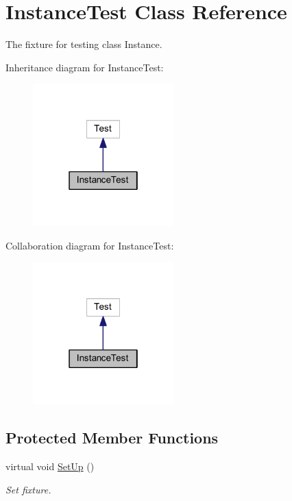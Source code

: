 \hypertarget{class_instance_test}{}\section{Instance\+Test Class Reference}
\label{class_instance_test}


The fixture for testing class Instance.  




Inheritance diagram for Instance\+Test\+:
\nopagebreak
\begin{figure}[H]
\begin{center}
\leavevmode
\includegraphics[width=154pt]{class_instance_test__inherit__graph}
\end{center}
\end{figure}


Collaboration diagram for Instance\+Test\+:
\nopagebreak
\begin{figure}[H]
\begin{center}
\leavevmode
\includegraphics[width=154pt]{class_instance_test__coll__graph}
\end{center}
\end{figure}
\subsection*{Protected Member Functions}
\begin{DoxyCompactItemize}
\item 
\hypertarget{class_instance_test_aada9591781662307abc3e7511d14187c}{}\label{class_instance_test_aada9591781662307abc3e7511d14187c} 
virtual void \hyperlink{class_instance_test_aada9591781662307abc3e7511d14187c}{Set\+Up} ()
\begin{DoxyCompactList}\small\item\em Set fixture. \end{DoxyCompactList}\end{DoxyCompactItemize}
